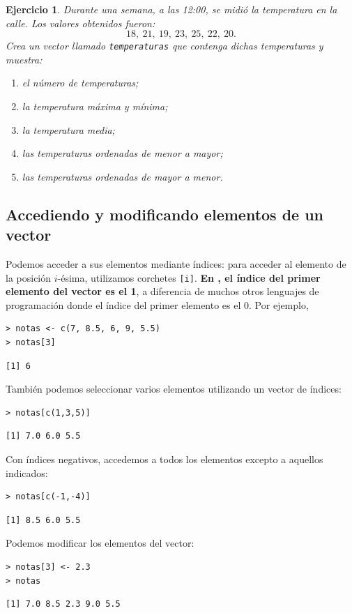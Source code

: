 \documentclass[11pt,a4paper]{article}
\newcommand{\R}{\textcolor{azuluc}{\faIcon{r-project}}}
\theoremstyle{exercise}
\newtheorem{exercise}{Ejercicio}
\begin{document}
\begin{exercise} Durante una semana, a las 12:00, se midió la temperatura en la calle. Los valores obtenidos fueron:
\[ 18,\ 21,\ 19,\ 23,\ 25,\ 22,\ 20. \]
Crea un vector llamado \texttt{temperaturas} que contenga dichas temperaturas y muestra:
\begin{enumerate}
	\item[a)] el número de temperaturas;
	\item[b)] la temperatura máxima y mínima;
	\item[c)] la temperatura media;
	\item[d)] las temperaturas ordenadas de menor a mayor;
	\item[e)] las temperaturas ordenadas de mayor a menor.
\end{enumerate}
\end{exercise}






\subsection{Accediendo y modificando elementos de un vector}


Podemos acceder a sus elementos mediante índices: para acceder al elemento de la posición $i$-ésima, utilizamos  corchetes \verb|[i]|. \textbf{En \R, el índice del primer elemento del vector es el 1}, a diferencia de muchos otros lenguajes de programación donde el índice del primer elemento es el 0. Por ejemplo,
\begin{lstlisting}[style=rconsole]
> notas <- c(7, 8.5, 6, 9, 5.5)
> notas[3]
\end{lstlisting}
\begin{lstlisting}[style=routput]
[1] 6
\end{lstlisting}
También podemos seleccionar varios elementos utilizando un vector de índices:
\begin{lstlisting}[style=rconsole]
> notas[c(1,3,5)]
\end{lstlisting}
\begin{lstlisting}[style=routput]
[1] 7.0 6.0 5.5
\end{lstlisting}
Con índices negativos, accedemos a todos los elementos excepto a aquellos indicados:
\begin{lstlisting}[style=rconsole]
> notas[c(-1,-4)]
\end{lstlisting}
\begin{lstlisting}[style=routput]
[1] 8.5 6.0 5.5
\end{lstlisting}
Podemos modificar los elementos del vector:
\begin{lstlisting}[style=rconsole]
> notas[3] <- 2.3
> notas
\end{lstlisting}
\begin{lstlisting}[style=routput]
[1] 7.0 8.5 2.3 9.0 5.5
\end{lstlisting}
\end{document}
